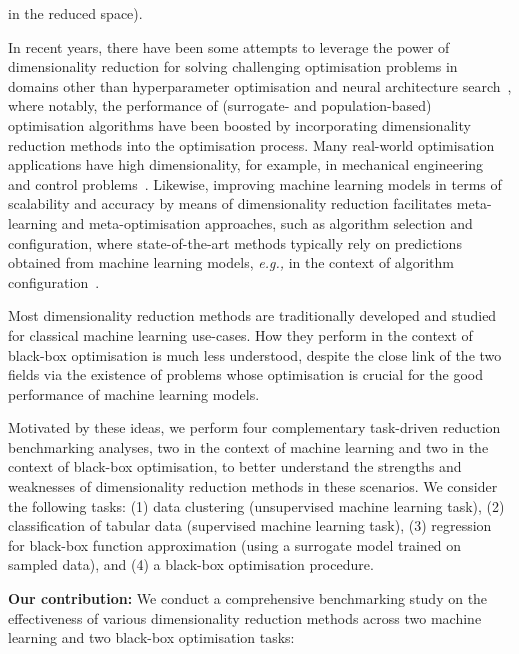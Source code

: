in the reduced space).  

In recent years, there have been some attempts to leverage the power of dimensionality reduction for solving challenging optimisation problems in domains other than hyperparameter optimisation and neural architecture search~\citep{RapEtAl20,AntEtAl22,MeiWan21b,WanEtAl16b,KapEtAl16,AbbEtAl20}, where notably, the performance of (surrogate- and population-based) optimisation algorithms have been boosted by incorporating dimensionality reduction methods into the optimisation process.
Many real-world optimisation applications have high dimensionality, for example, in mechanical engineering~\citep{Jones08} and control problems~\citep{ZuoEtAl24}. 
Likewise, improving machine learning models in terms of scalability and accuracy by means of dimensionality reduction facilitates meta-learning and meta-optimisation approaches, such as algorithm selection and configuration, where state-of-the-art methods typically rely on predictions obtained from machine learning models, \emph{e.g.,} in the context of algorithm configuration~\citep{HutEtAl11}.




Most dimensionality reduction methods are traditionally developed and studied for classical machine learning use-cases.
How they perform in the context of  black-box optimisation is much less understood, despite the close link of the two fields via the existence of problems whose optimisation is crucial for the good performance of machine learning models.


Motivated by these ideas, we perform four complementary task-driven reduction benchmarking analyses, two in the context of machine learning and two in the context of  black-box optimisation, to better understand the strengths and weaknesses of dimensionality reduction methods in these scenarios.
We consider the following tasks:
(1) data clustering (unsupervised machine learning task), (2) classification of tabular data (supervised machine learning task), 
(3) regression for black-box function approximation (using a surrogate model trained on sampled data), 
and (4) a black-box optimisation procedure. 







\textbf{Our contribution:} We conduct a comprehensive benchmarking study on the effectiveness of various dimensionality reduction methods across two machine learning and two black-box optimisation tasks:\\






